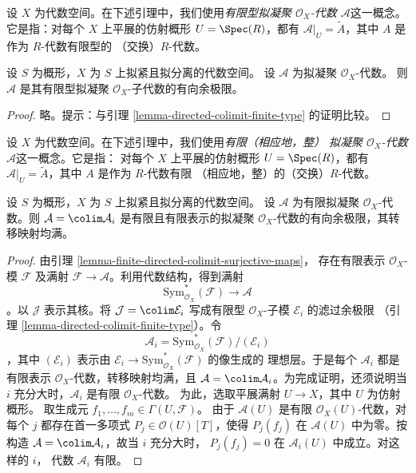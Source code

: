 \noindent
设 $X$ 为代数空间。在下述引理中，我们使用{\it 有限型拟凝聚
$\mathcal{O}_X$-代数 $\mathcal{A}$}这一概念。它是指：对每个
$X$ 上平展的仿射概形 $U = \Spec(R)$，都有
$\mathcal{A}|_U = \widetilde{A}$，其中 $A$ 是作为 $R$-代数有限型的
（交换）$R$-代数。

\begin{lemma}
\label{lemma-algebra-directed-colimit-finite-type}
设 $S$ 为概形，$X$ 为 $S$ 上拟紧且拟分离的代数空间。
设 $\mathcal{A}$ 为拟凝聚 $\mathcal{O}_X$-代数。
则 $\mathcal{A}$ 是其有限型拟凝聚 $\mathcal{O}_X$-子代数的有向余极限。
\end{lemma}

\begin{proof}
略。提示：与引理 \ref{lemma-directed-colimit-finite-type} 的证明比较。
\end{proof}

\noindent
设 $X$ 为代数空间。在下述引理中，我们使用{\it 有限（相应地，整）
拟凝聚 $\mathcal{O}_X$-代数 $\mathcal{A}$}这一概念。它是指：
对每个 $X$ 上平展的仿射概形 $U = \Spec(R)$，都有
$\mathcal{A}|_U = \widetilde{A}$，其中 $A$ 是作为 $R$-代数有限
（相应地，整）的（交换）$R$-代数。

\begin{lemma}
\label{lemma-finite-algebra-directed-colimit-finite-finitely-presented}
设 $S$ 为概形，$X$ 为 $S$ 上拟紧且拟分离的代数空间。
设 $\mathcal{A}$ 为有限拟凝聚 $\mathcal{O}_X$-代数。则
$\mathcal{A} = \colim \mathcal{A}_i$ 是有限且有限表示的拟凝聚
$\mathcal{O}_X$-代数的有向余极限，其转移映射均满。
\end{lemma}

\begin{proof}
由引理 \ref{lemma-finite-directed-colimit-surjective-maps}，
存在有限表示 $\mathcal{O}_X$-模 $\mathcal{F}$ 及满射
$\mathcal{F} \to \mathcal{A}$。利用代数结构，得到满射
$$
\text{Sym}^*_{\mathcal{O}_X}(\mathcal{F}) \longrightarrow \mathcal{A}
$$
。以 $\mathcal{J}$ 表示其核。将
$\mathcal{J} = \colim \mathcal{E}_i$ 写成有限型
$\mathcal{O}_X$-子模 $\mathcal{E}_i$ 的滤过余极限
（引理 \ref{lemma-directed-colimit-finite-type}）。令
$$
\mathcal{A}_i = \text{Sym}^*_{\mathcal{O}_X}(\mathcal{F})/(\mathcal{E}_i)
$$
，其中 $(\mathcal{E}_i)$ 表示由
$\mathcal{E}_i \to \text{Sym}^*_{\mathcal{O}_X}(\mathcal{F})$ 的像生成的
理想层。于是每个 $\mathcal{A}_i$ 都是有限表示
$\mathcal{O}_X$-代数，转移映射均满，且
$\mathcal{A} = \colim \mathcal{A}_i$。为完成证明，还须说明当 $i$
充分大时，$\mathcal{A}_i$ 是有限 $\mathcal{O}_X$-代数。
为此，选取平展满射 $U \to X$，其中 $U$ 为仿射概形。
取生成元 $f_1,\ldots,f_m \in \Gamma(U,\mathcal{F})$。
由于 $\mathcal{A}(U)$ 是有限 $\mathcal{O}_X(U)$-代数，对每个 $j$
都存在首一多项式 $P_j \in \mathcal{O}(U)[T]$，使得
$P_j(f_j)$ 在 $\mathcal{A}(U)$ 中为零。按构造
$\mathcal{A} = \colim \mathcal{A}_i$，故当 $i$ 充分大时，
$P_j(f_j) = 0$ 在 $\mathcal{A}_i(U)$ 中成立。对这样的 $i$，
代数 $\mathcal{A}_i$ 有限。
\end{proof}

